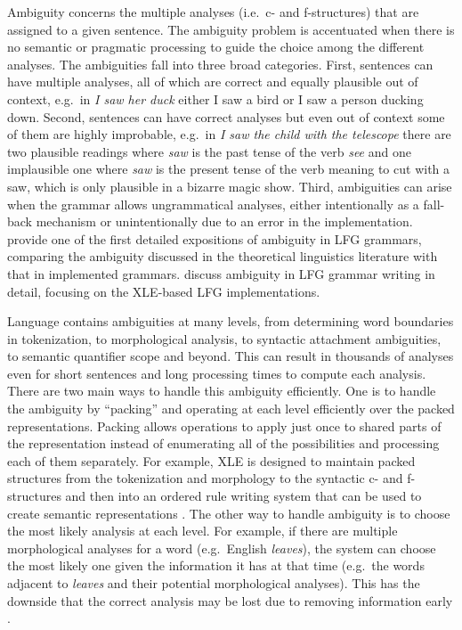 \documentclass[output=paper,hidelinks]{langscibook}
\begin{document}
Ambiguity concerns the multiple analyses (i.e.\ c- and f-structures) that are assigned to a given sentence. The ambiguity problem is accentuated when there is no semantic or pragmatic processing to guide the choice among the different analyses. The ambiguities fall into three broad categories. First, sentences can have multiple analyses, all of which are correct and equally plausible out of context, e.g.\ in {\em I saw her duck} either I saw a bird or I saw a person ducking down. Second, sentences can have correct analyses but even out of context some of them are highly improbable, e.g.\ in {\em I saw the child with the telescope} there are two plausible readings where {\em saw} is the past tense of the verb {\em see} and one implausible one where {\em saw} is the present tense of the verb meaning to cut with a saw, which is only plausible in a bizarre magic show. Third, ambiguities can arise when the grammar allows ungrammatical analyses, either intentionally as a fall-back mechanism or unintentionally due to an error in the implementation. \cite{coppermansegond96} provide one of the first detailed expositions of ambiguity in LFG grammars, comparing the ambiguity discussed in the theoretical linguistics literature with that in implemented grammars. \cite{kingetal04} discuss ambiguity in LFG grammar writing in detail, focusing on the XLE-based LFG implementations.

Language contains ambiguities at many levels, from determining word boundaries in tokenization, to morphological analysis, to syntactic attachment ambiguities, to semantic quantifier scope and beyond. This can result in thousands of analyses even for short sentences and long processing times to compute each analysis. There are two main ways to handle this ambiguity efficiently. One is to handle the ambiguity by ``packing'' \citep{maxwellkaplan89,maxwellkaplan93,shemtov97} and operating at each level efficiently over the packed representations. Packing allows operations to apply just once to shared parts of the representation instead of enumerating all of the possibilities and processing each of them separately. For example, XLE is designed to maintain packed structures from the tokenization and morphology to the syntactic c- and f-structures and then into an ordered rule writing system that can be used to create semantic representations \citep{crouchking06}. The other way to handle ambiguity is to choose the most likely analysis at each level. For example, if there are multiple morphological analyses for a word (e.g.\ English {\em leaves}), the system can choose the most likely one given the information it has at that time (e.g.\ the words adjacent to {\em leaves} and their potential morphological analyses). This has the downside that the correct analysis may be lost due to removing information early \citep{dalrymple06}. 
\end{document}
